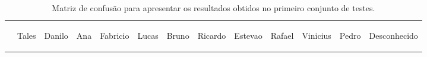 	\begin{table}[htb]
		\begin{center}
			\caption{Matriz de confusão para apresentar os resultados obtidos no primeiro conjunto de testes.}
			\label{tab:matriz-confusao}
			\begin{tabular}{|c|c|c|c|c|c|c|c|c|c|c|c|c|}
				\hline  & \bf \begin{sideways}Tales\end{sideways} & \bf \begin{sideways}Danilo\end{sideways} & \bf \begin{sideways}Ana\end{sideways} & \bf \begin{sideways}Fabricio\end{sideways} & \bf \begin{sideways}Lucas\end{sideways} & \bf \begin{sideways}Bruno\end{sideways} & \bf \begin{sideways}Ricardo\end{sideways} & \bf \begin{sideways}Estevao\end{sideways} & \bf \begin{sideways}Rafael\end{sideways} &
				\bf \begin{sideways}Vinicius\end{sideways} & \bf \begin{sideways}Pedro\end{sideways} & \bf \begin{sideways}Desconhecido\end{sideways}\\ 
				

\end{tabular}
\end{center}
\end{table}
